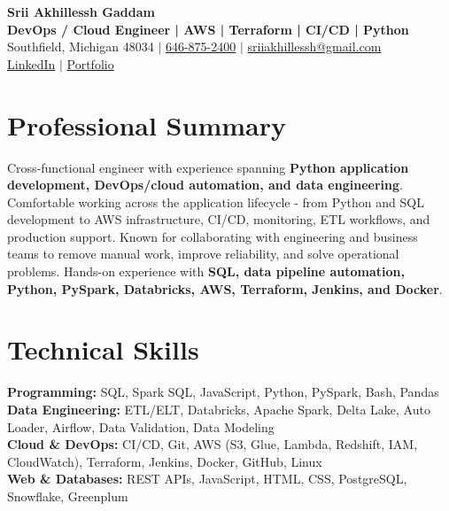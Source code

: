 \documentclass[letterpaper,10pt]{article}
\begin{document}
\fontsize{9.35pt}{10.45pt}\selectfont

\begin{center}
    {\LARGE \textbf{Srii Akhillessh Gaddam}} \\[-1pt]
    \textbf{DevOps / Cloud Engineer | AWS | Terraform | CI/CD | Python} \\[2pt]
    Southfield, Michigan 48034 $|$
    \href{tel:6468752400}{646-875-2400} $|$
    \href{mailto:sriiakhillessh@gmail.com}{sriiakhillessh@gmail.com} \\[1pt]
    \href{https://www.linkedin.com/in/srii-akhiilessh-gaddam-b48668191/}{LinkedIn} $|$
    \href{https://sriiakhillesshg.github.io/portfolio/}{Portfolio}
\end{center}
\vspace{-8pt}

\section{Professional Summary}
\small{Cross-functional engineer with experience spanning \textbf{Python application development, DevOps/cloud automation, and data engineering}. Comfortable working across the application lifecycle - from Python and SQL development to AWS infrastructure, CI/CD, monitoring, ETL workflows, and production support. Known for collaborating with engineering and business teams to remove manual work, improve reliability, and solve operational problems. Hands-on experience with \textbf{SQL, data pipeline automation, Python, PySpark, Databricks, AWS, Terraform, Jenkins, and Docker}.}

\section{Technical Skills}
\small{
\textbf{Programming:} SQL, Spark SQL, JavaScript, Python, PySpark, Bash, Pandas \\
\textbf{Data Engineering:} ETL/ELT, Databricks, Apache Spark, Delta Lake, Auto Loader, Airflow, Data Validation, Data Modeling \\
\textbf{Cloud \& DevOps:} CI/CD, Git, AWS (S3, Glue, Lambda, Redshift, IAM, CloudWatch), Terraform, Jenkins, Docker, GitHub, Linux \\
\textbf{Web \& Databases:} REST APIs, JavaScript, HTML, CSS, PostgreSQL, Snowflake, Greenplum
}
\end{document}
